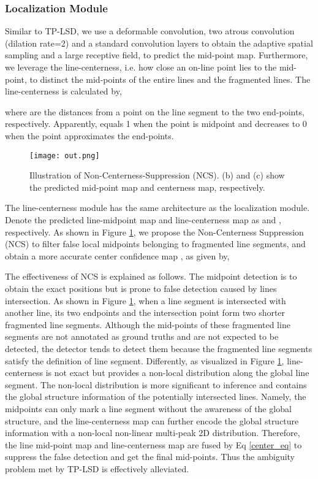 \documentclass[10pt,twocolumn,letterpaper]{article}
\begin{document}
\subsubsection{Localization Module}
Similar to TP-LSD\cite{TP-LSD}, we use a deformable convolution, two atrous convolution (dilation rate=2) and a standard convolution layers to obtain the adaptive spatial sampling and a large receptive field, to predict the mid-point map. Furthermore, we leverage the line-centerness, i.e. how close an on-line point lies to the mid-point, to distinct the mid-points of the entire lines and the fragmented lines. The line-centerness is calculated by,
\begin{small}

\end{small}
where  are the distances from a point on the line segment to the two end-points, respectively. Apparently,  equals 1 when the point is midpoint and decreases to 0 when the point approximates the end-points.  
\begin{figure}[t]
\begin{center}
\texttt{[image: out.png]}
\end{center}
   \caption{Illustration of Non-Centerness-Suppression (NCS). (b) and (c) show the predicted mid-point map and centerness map, respectively.}
\label{centerness}
\end{figure}

The line-centerness module has the same architecture as the localization module. 
Denote the predicted line-midpoint map and line-centerness map as  and , respectively. As shown in Figure \ref{centerness}, we propose the Non-Centerness Suppression (NCS) to filter false local midpoints belonging to fragmented line segments, and obtain a more accurate center confidence map , as given by,




The effectiveness of NCS is explained as follows. The midpoint detection is to obtain the exact positions but is prone to false detection caused by lines intersection. As shown in Figure \ref{centerness}, when a line segment is intersected with another line, its two endpoints and the intersection point form two shorter fragmented line segments. Although the mid-points of these fragmented line segments are not annotated as ground truths and are not expected to be detected, the detector tends to detect them because the fragmented line segments satisfy the definition of line segment. Differently, as visualized in Figure \ref{centerness}, line-centerness is not exact but provides a non-local distribution along the global line segment. The non-local distribution is more significant to inference and contains the global structure information of the potentially intersected lines. Namely, the midpoints can only mark a line segment without the awareness of the global structure, and the line-centerness map can further encode the global structure information with a non-local non-linear multi-peak 2D distribution. Therefore, the line mid-point map and line-centerness map are fused by Eq \ref{center_eq} to suppress the false detection and get the final mid-points. Thus the ambiguity problem met by TP-LSD is effectively alleviated.
\end{document}
